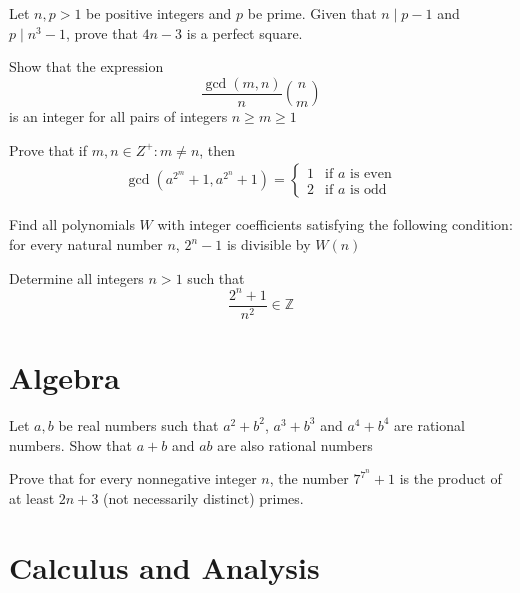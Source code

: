 \begin{problem}[N][3][Iran 2005]
    Let $n,p>1$ be positive integers and $p$ be prime. Given that $n \mid p-1$ and $p \mid n^3-1$, prove that $4n-3$ is a perfect square.
\end{problem}

\begin{problem}[N][5][Putnam 2000]
    Show that the expression 
    $$ \frac{\gcd(m,n)}{n} \binom{n}{m} $$
    is an integer for all pairs of integers $n \geq m \geq 1$
\end{problem}

\begin{problem}
    Prove that if $m,n \in Z^+: m \neq n$, then
    \begin{align*}
        \gcd \left(a^{2^m}+1, a^{2^n}+1\right) = 
        \begin{cases}
            1 & \text{if } a \text{ is even} \\
            2 & \text{if } a \text{ is odd}
        \end{cases}
    \end{align*}
\end{problem}

\begin{problem}[N][6][Polish 2003]
    Find all polynomials $W$ with integer coefficients satisfying the following condition: for every natural number $n$, $2^n-1$ is divisible by $W(n)$
\end{problem}

\begin{problem}[N][8][IMO 1990]
    Determine all integers $n>1$ such that
    $$\frac{2^n+1}{n^2} \in \mathbb{Z}$$
\end{problem}

\newpage

\section{Algebra}

\begin{problem}[A][4]
    Let $a,b$ be real numbers such that  $a^2+b^2$, $a^3+b^3$ and $a^4+b^4$ are rational numbers. Show that $a+b$ and $ab$ are also rational numbers
\end{problem}

\begin{problem}[A][9][USAMO 2007]
    Prove that for every nonnegative integer $n$, the number $7^{7^n}+1$ is the product of at least $2n + 3$ (not necessarily distinct) primes.
\end{problem}



\newpage

\section{Calculus and Analysis}




